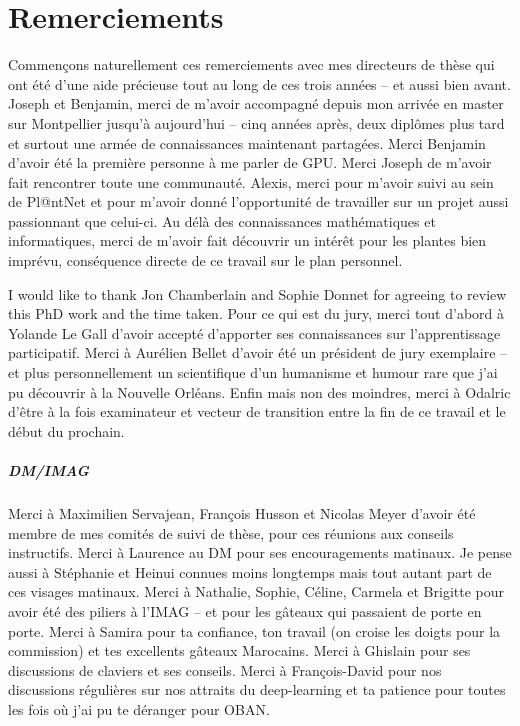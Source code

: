 \chapter{Remerciements}


Commençons naturellement ces remerciements avec mes directeurs de thèse qui ont été d'une aide précieuse tout au long de ces trois années -- et aussi bien avant.
Joseph et Benjamin, merci de m'avoir accompagné depuis mon arrivée en master sur Montpellier jusqu'à aujourd'hui -- cinq années après, deux diplômes plus tard et surtout une armée de connaissances maintenant partagées.
Merci Benjamin d'avoir été la première personne à me parler de GPU.
Merci Joseph de m'avoir fait rencontrer toute une communauté.
Alexis, merci pour m'avoir suivi au sein de Pl@ntNet et pour m'avoir donné l'opportunité de travailler sur un projet aussi passionnant que celui-ci.
Au délà des connaissances mathématiques et informatiques, merci de m'avoir fait découvrir un intérêt pour les plantes bien imprévu, conséquence directe de ce travail sur le plan personnel.

\medskip

I would like to thank Jon Chamberlain and Sophie Donnet for agreeing to review this PhD work and the time taken.
Pour ce qui est du jury, merci tout d'abord à Yolande Le Gall d'avoir accepté d'apporter ses connaissances sur l'apprentissage participatif. Merci à Aurélien Bellet d'avoir été un président de jury exemplaire -- et plus personnellement un scientifique d'un humanisme et humour rare que j'ai pu découvrir à la Nouvelle Orléans. Enfin mais non des moindres, merci à Odalric d'être à la fois examinateur et vecteur de transition entre la fin de ce travail et le début du prochain.

\medskip

\paragraph*{DM/IMAG}
Merci à Maximilien Servajean, François Husson et Nicolas Meyer d'avoir été membre de mes comités de suivi de thèse, pour ces réunions aux conseils instructifs.
Merci à Laurence au DM pour ses encouragements matinaux. Je pense aussi à Stéphanie et Heinui connues moins longtemps mais tout autant part de ces visages matinaux.
Merci à Nathalie, Sophie, Céline, Carmela et Brigitte pour avoir été des piliers à l'IMAG -- et pour les gâteaux qui passaient de porte en porte.
Merci à Samira pour ta confiance, ton travail (on croise les doigts pour la commission) et tes excellents gâteaux Marocains.
Merci à Ghislain pour ses discussions de claviers et ses conseils.
Merci à François-David pour nos discussions régulières sur nos attraits du deep-learning et ta patience pour toutes les fois où j'ai pu te déranger pour OBAN.
\medskip


